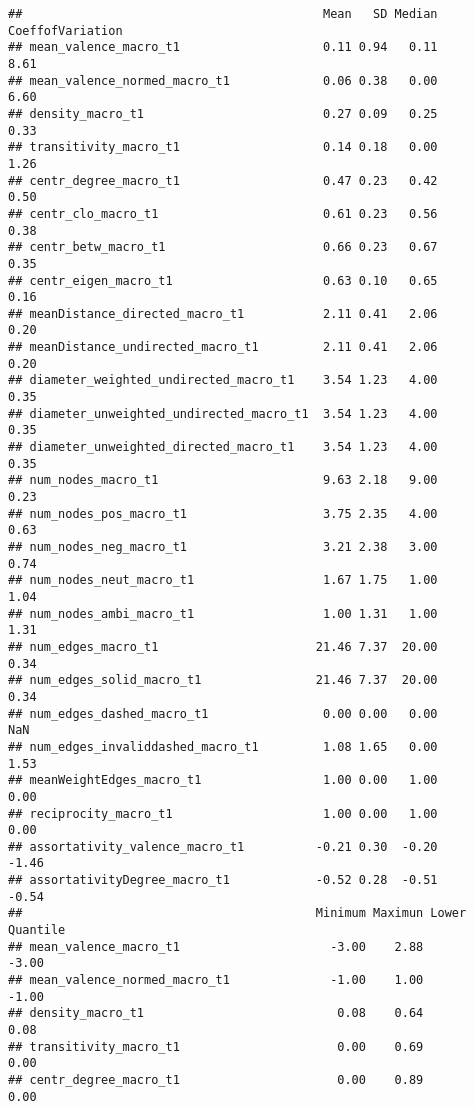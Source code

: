 \documentclass[
]{article}
\begin{document}
\begin{verbatim}
##                                          Mean   SD Median CoeffofVariation
## mean_valence_macro_t1                    0.11 0.94   0.11             8.61
## mean_valence_normed_macro_t1             0.06 0.38   0.00             6.60
## density_macro_t1                         0.27 0.09   0.25             0.33
## transitivity_macro_t1                    0.14 0.18   0.00             1.26
## centr_degree_macro_t1                    0.47 0.23   0.42             0.50
## centr_clo_macro_t1                       0.61 0.23   0.56             0.38
## centr_betw_macro_t1                      0.66 0.23   0.67             0.35
## centr_eigen_macro_t1                     0.63 0.10   0.65             0.16
## meanDistance_directed_macro_t1           2.11 0.41   2.06             0.20
## meanDistance_undirected_macro_t1         2.11 0.41   2.06             0.20
## diameter_weighted_undirected_macro_t1    3.54 1.23   4.00             0.35
## diameter_unweighted_undirected_macro_t1  3.54 1.23   4.00             0.35
## diameter_unweighted_directed_macro_t1    3.54 1.23   4.00             0.35
## num_nodes_macro_t1                       9.63 2.18   9.00             0.23
## num_nodes_pos_macro_t1                   3.75 2.35   4.00             0.63
## num_nodes_neg_macro_t1                   3.21 2.38   3.00             0.74
## num_nodes_neut_macro_t1                  1.67 1.75   1.00             1.04
## num_nodes_ambi_macro_t1                  1.00 1.31   1.00             1.31
## num_edges_macro_t1                      21.46 7.37  20.00             0.34
## num_edges_solid_macro_t1                21.46 7.37  20.00             0.34
## num_edges_dashed_macro_t1                0.00 0.00   0.00              NaN
## num_edges_invaliddashed_macro_t1         1.08 1.65   0.00             1.53
## meanWeightEdges_macro_t1                 1.00 0.00   1.00             0.00
## reciprocity_macro_t1                     1.00 0.00   1.00             0.00
## assortativity_valence_macro_t1          -0.21 0.30  -0.20            -1.46
## assortativityDegree_macro_t1            -0.52 0.28  -0.51            -0.54
##                                         Minimum Maximun Lower Quantile
## mean_valence_macro_t1                     -3.00    2.88          -3.00
## mean_valence_normed_macro_t1              -1.00    1.00          -1.00
## density_macro_t1                           0.08    0.64           0.08
## transitivity_macro_t1                      0.00    0.69           0.00
## centr_degree_macro_t1                      0.00    0.89           0.00

\end{verbatim}
\end{document}
